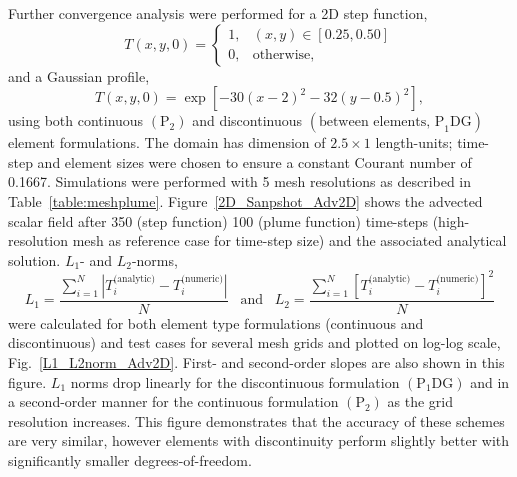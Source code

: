 \documentclass[preprint,authoryear,12pt]{elsarticle}
\begin{document}
Further convergence analysis were performed for a 2D step function,
\begin{displaymath}
T\left(x, y,0\right) =\begin{cases}
1, & \left(x,y\right)\in \left[0.25,0.50\right] \\%
0, & \text{otherwise,}
\end{cases}
\end{displaymath}
and a Gaussian profile,
\begin{displaymath}
T\left(x, y,0\right) = \exp{\left[-30\left(x-2\right)^{2}-32\left(y-0.5\right)^{2}\right]},
\end{displaymath}
using both continuous $\left(\text{P}_{2}\right)$ and discontinuous $\left(\text{between elements, P}_{1}\text{DG}\right)$ element formulations. The domain has dimension of $2.5\times 1$ length-units; time-step and element sizes were chosen to ensure a constant Courant number of 0.1667.  Simulations were performed with 5 mesh resolutions as described in Table~\ref{table:meshplume}. Figure~\ref{2D_Sanpshot_Adv2D} shows the advected scalar field after 350 (step function) 100 (plume function) time-steps (high-resolution  mesh as reference case for time-step size) and the associated analytical solution. $L_{1}$- and $L_{2}$-norms,
\begin{displaymath}
L_{1}=\displaystyle\frac{\sum\limits_{i=1}^{N}\left|T_{i}^{\text{(analytic)}}-T_{i}^{\text{(numeric)}}\right|}{N}\;\;\;\text{and}\;\;\;L_{2}=\displaystyle\frac{\sum\limits_{i=1}^{N}\left[T_{i}^{\text{(analytic)}}-T_{i}^{\text{(numeric)}}\right]^{2}}{N}
\end{displaymath} 
were calculated for both element type formulations (continuous and discontinuous) and test cases for several mesh grids and plotted on log-log scale, Fig.~\ref{L1_L2norm_Adv2D}. First- and second-order slopes are also shown in this figure. $L_{1}$ norms drop linearly for the discontinuous formulation $\left(\text{P}_{1}\text{DG}\right)$ and in a second-order manner for the continuous formulation $\left(\text{P}_{2}\right)$ as the grid resolution increases. This figure demonstrates that the accuracy of these schemes are very similar, however elements with discontinuity perform slightly better with significantly smaller degrees-of-freedom. 
\end{document}

